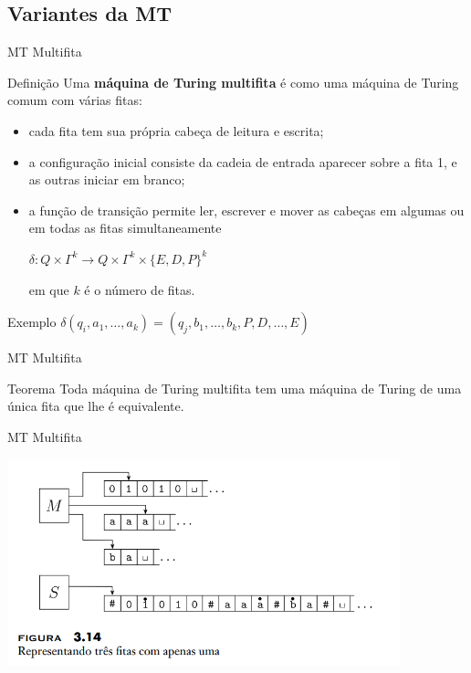 \documentclass[xcolor=dvipsnames,table]{beamer}
\begin{document}
	\subsection{Variantes da MT}
	\begin{frame}[shrink]{MT Multifita}
		\begin{block}{Definição}
			Uma {\bf máquina de Turing multifita} é como uma máquina de Turing comum com várias fitas:
			\begin{itemize}  
				\item cada fita tem sua própria cabeça de leitura e escrita;  
				\item a configuração inicial consiste da cadeia de entrada aparecer sobre a fita 1, e as outras iniciar em branco;  
				\item a função de transição permite ler, escrever e mover as cabeças em algumas ou em todas as fitas simultaneamente
				\begin{center}
					$\delta : Q \times \Gamma^k \rightarrow Q \times \Gamma^k \times \{E,D,P\}^k$
				\end{center}
				em que $k$ é o número de fitas.
			\end{itemize}
		\end{block} 
		\begin{block}{Exemplo}
			$\delta(q_i, a_1, \ldots, a_k) = (q_j, b_1, \ldots, b_k, P, D, \ldots, E)$
		\end{block}
	\end{frame}
	
	\begin{frame}{MT Multifita}
		\begin{block}{Teorema}
			Toda máquina de Turing multifita tem uma máquina de Turing de uma única fita que lhe é equivalente.
		\end{block}
	\end{frame}
	
	\begin{frame}{MT Multifita}
		\begin{center}
			\includegraphics[height=6cm]{images/fig314.png}
		\end{center}
	\end{frame}
	
\end{document}
